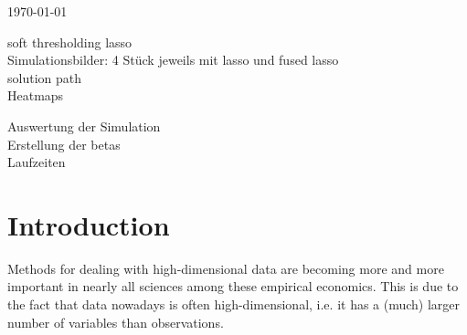 \documentclass{article}
\theoremstyle{definition}
\begin{document}
\begin{titlepage}
	
	
	\vfill\vfill\vfill %
	
	{\large\today} %
	
	
	 
	
	\vfill %
	
\end{titlepage} \newpage


\tableofcontents \newpage


\listoffigures
soft thresholding lasso \\
Simulationsbilder: 4 Stück jeweils mit lasso und fused lasso \\
solution path \\
Heatmaps


\listoftables 
Auswertung der Simulation \\
Erstellung der betas \\
Laufzeiten
\newpage 


\section{Introduction}
Methods for dealing with high-dimensional data are becoming more and more important in nearly all sciences among these empirical economics. This is due to the fact that data nowadays is often high-dimensional, i.e. it has a (much) larger number of variables than observations.
\end{document}
